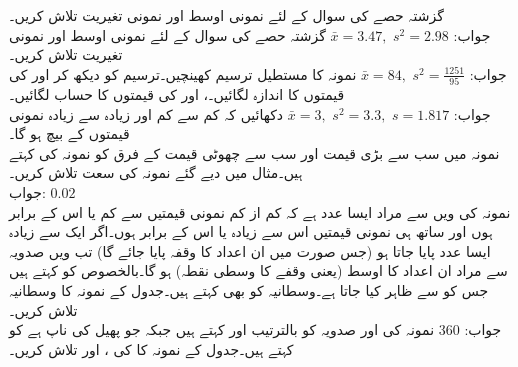 \quad
گزشتہ حصے کی سوال  کے لئے نمونی اوسط اور نمونی تغیریت تلاش کریں۔\\
جواب:\quad
$\bar{x}=3.47,\,\, s^2=2.98$
\quad
گزشتہ حصے کی سوال  کے لئے نمونی اوسط اور نمونی تغیریت تلاش کریں۔\\
جواب:\quad
$\bar{x}=84,\,\,s^2=\tfrac{1251}{95}$
\quad
نمونہ  کا مستطیل ترسیم کھینچیں۔ترسیم کو دیکھ کر  اور  کی قیمتوں کا اندازہ لگائیں۔،  اور  کی قیمتوں کا حساب لگائیں۔\\
جواب:\quad
$\bar{x}=3,\,\, s^2=3.3,\,\, s=1.817$
\quad
دکھائیں کہ کم سے کم اور زیادہ سے زیادہ نمونی قیمتوں کے بیچ  ہو گا۔
\quad {}\\
نمونہ میں سب سے بڑی قیمت اور سب سے چھوٹی قیمت کے فرق کو نمونہ کی  کہتے ہیں۔مثال  میں دیے گئے نمونہ کی سعت تلاش کریں۔\\
جواب:\quad
$0.02$
\quad {}\\
نمونہ کی  ویں  سے مراد ایسا عدد  ہے کہ کم از کم  نمونی قیمتیں  سے کم یا اس کے برابر ہوں اور ساتھ ہی  نمونی قیمتیں اس سے زیادہ یا اس کے برابر ہوں۔اگر ایک سے زیادہ ایسا عدد پایا جاتا ہو (جس صورت میں ان اعداد کا وقفہ پایا جائے گا) تب  ویں صدویہ سے مراد ان اعداد کا اوسط (یعنی وقفے  کا وسطی نقطہ) ہو گا۔بالخصوص  کو  کہتے ہیں جس کو  سے ظاہر کیا جاتا ہے۔وسطانیہ کو  بھی کہتے ہیں۔جدول  کے نمونہ  کا وسطانیہ  تلاش کریں۔\\
جواب:\quad
$360$
\quad 
نمونہ کی  اور  صدویہ کو بالترتیب  اور  کہتے ہیں جبکہ  جو پھیل کی ناپ ہے کو  کہتے ہیں۔جدول  کے نمونہ  کا کی ،  اور  تلاش کریں۔\\
